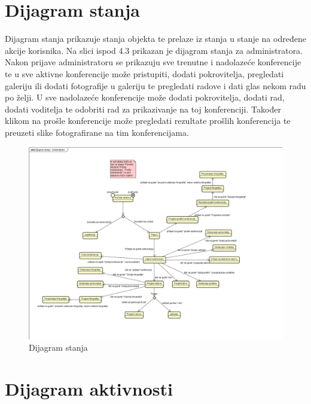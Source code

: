 			
			
			\eject
		
		\section{Dijagram stanja}
			
			

			
			\textit{}Dijagram stanja prikazuje stanja objekta te prelaze iz stanja u stanje na određene akcije korisnika. Na slici ispod 4.3 prikazan je dijagram stanja za administratora. Nakon prijave administratoru se prikazuju sve trenutne i nadolazeće konferencije te u sve aktivne konferencije može pristupiti, dodati pokrovitelja, pregledati galeriju ili dodati fotografije u galeriju te pregledati radove i dati glas nekom radu po želji. U sve nadolazeće konferencije može dodati pokrovitelja, dodati rad, dodati voditelja te odobriti rad za prikazivanje na toj konferenciji. Također klikom na prošle konferencije može pregledati rezultate prošlih konferencija te preuzeti slike fotografirane na tim konferencijama.
			
			\begin{figure}[htb]
				\centering
				\includegraphics[width=15cm]{slike/Dijagram_stanja_admin.jpg}
				\caption{Dijagram stanja}
				\label{fig:fer-logo}
			\end{figure}
			
			\eject 
		
		\section{Dijagram aktivnosti}
			
